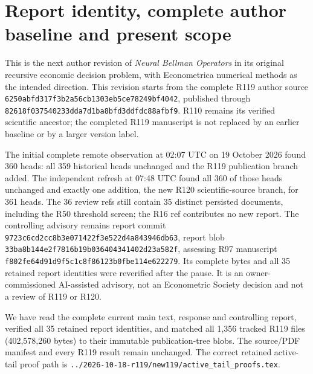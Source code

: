 \section{Report identity, complete author baseline and present scope}
This is the next author revision of \emph{Neural Bellman Operators} in its original recursive economic decision problem, with Econometrica numerical methods as the intended direction. This revision starts from the complete R119 author source \nolinkurl{6250abfd317f3b2a56cb1303eb5ce78249bf4042}, published through \nolinkurl{82618f037540233dda7d1ba8bfd3ddfdc88afbf9}. R110 remains its verified scientific ancestor; the completed R119 manuscript is not replaced by an earlier baseline or by a larger version label.

The initial complete remote observation at 02:07 UTC on 19 October 2026 found 360 heads: all 359 historical heads unchanged and the R119 publication branch added. The independent refresh at 07:48 UTC found all 360 of those heads unchanged and exactly one addition, the new R120 scientific-source branch, for 361 heads. The 36 review refs still contain 35 distinct persisted documents, including the R50 threshold screen; the R16 ref contributes no new report. The controlling advisory remains report commit \nolinkurl{9723c6cd2cc8b3e071422f3e522d4a843946db63}, report blob \nolinkurl{33ba8b144e2f7816b19b036404341402d23a582f}, assessing R97 manuscript \nolinkurl{f802fe64d91d9f5c1c8f86123b0fbe114e622279}. Its complete bytes and all 35 retained report identities were reverified after the pause. It is an owner-commissioned AI-assisted advisory, not an Econometric Society decision and not a review of R119 or R120.

We have read the complete current main text, response and controlling report, verified all 35 retained report identities, and matched all 1,356 tracked R119 files (402,578,260 bytes) to their immutable publication-tree blobs. The source/PDF manifest and every R119 result remain unchanged. The correct retained active-tail proof path is \nolinkurl{../2026-10-18-r119/new119/active_tail_proofs.tex}.

